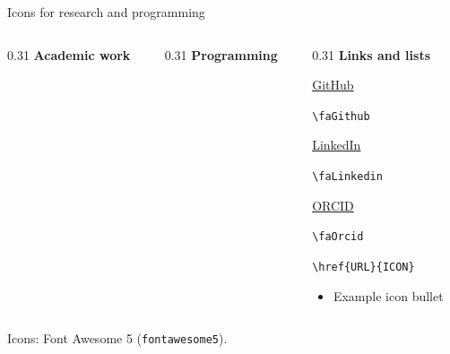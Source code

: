 \begin{frame}[t]{Icons for research and programming}
    \begin{columns}[T,onlytextwidth]
        \begin{column}{0.31\textwidth}
            \textbf{Academic work}
            \par\medskip
        \end{column}
        \begin{column}{0.31\textwidth}
            \textbf{Programming}
            \par\medskip
        \end{column}
        \begin{column}{0.31\textwidth}
            \textbf{Links and lists}
            \par\medskip
            \href{https://github.com/}{\faGithub\quad GitHub}
            \par
            {\scriptsize\texttt{\textbackslash faGithub}\par}
            \smallskip
            \href{https://www.linkedin.com/}{\faLinkedin\quad LinkedIn}
            \par
            {\scriptsize\texttt{\textbackslash faLinkedin}\par}
            \smallskip
            \href{https://orcid.org/}{\faOrcid\quad ORCID}
            \par
            {\scriptsize\texttt{\textbackslash faOrcid}\par}
            \medskip
            {\scriptsize\texttt{\textbackslash href\{URL\}\{ICON\}}\par}
            \begin{itemize}
                \item[\faCheck] Example icon bullet
            \end{itemize}
        \end{column}
    \end{columns}
    \par\medskip
    {\scriptsize Icons: Font Awesome 5 (\texttt{fontawesome5}).\par}
\end{frame}


